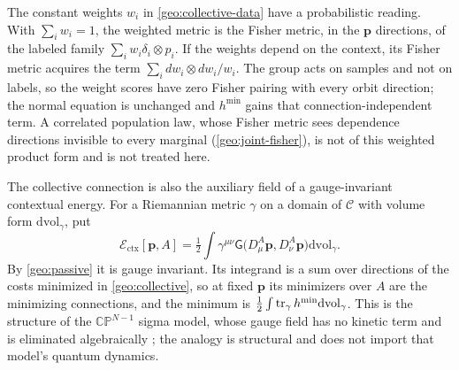 The constant weights $w_i$ in \cref{geo:collective-data} have a probabilistic reading. With $\sum_iw_i=1$, the weighted metric is the Fisher metric, in the $\boldsymbol p$ directions, of the labeled family $\sum_iw_i\delta_i\otimes p_i$. If the weights depend on the context, its Fisher metric acquires the term $\sum_idw_i\otimes dw_i/w_i$. The group acts on samples and not on labels, so the weight scores have zero Fisher pairing with every orbit direction; the normal equation is unchanged and $h^{\min}$ gains that connection-independent term. A correlated population law, whose Fisher metric sees dependence directions invisible to every marginal (\cref{geo:joint-fisher}), is not of this weighted product form and is not treated here.

The collective connection is also the auxiliary field of a gauge-invariant contextual energy. For a Riemannian metric $\gamma$ on a domain of $\mathcal C$ with volume form $\mathrm{dvol}_\gamma$, put
\begin{equation}
\mathcal E_{\mathrm{ctx}}[\boldsymbol p,A]
=\tfrac12\int\gamma^{\mu\nu}\mathsf G\bigl(D^A_\mu\boldsymbol p,D^A_\nu\boldsymbol p\bigr)\mathrm{dvol}_\gamma.
\label{geo:context-energy}
\end{equation}
By \cref{geo:passive} it is gauge invariant. Its integrand is a sum over directions of the costs minimized in \cref{geo:collective}, so at fixed $\boldsymbol p$ its minimizers over $A$ are the minimizing connections, and the minimum is $\tfrac12\int\operatorname{tr}_\gamma h^{\min}\mathrm{dvol}_\gamma$. This is the structure of the $\mathbb{CP}^{N-1}$ sigma model, whose gauge field has no kinetic term and is eliminated algebraically \citep{DAddaLuscherDiVecchia1978}; the analogy is structural and does not import that model's quantum dynamics.

